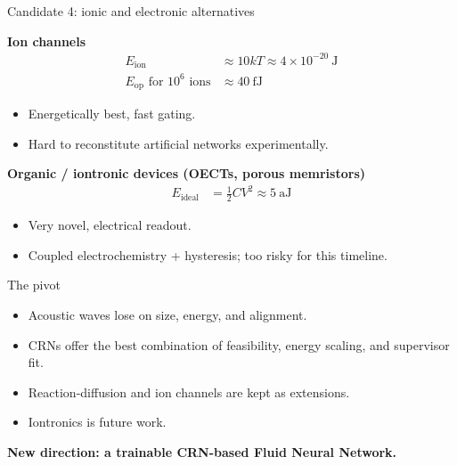 \documentclass[aspectratio=169,11pt]{beamer}
\begin{document}
\begin{frame}{Candidate 4: ionic and electronic alternatives}

\textbf{Ion channels}
\begin{align*}
    E_{\text{ion}} &\approx 10kT \approx 4\times10^{-20}\ \text{J} \\
    E_{\text{op}} \text{ for } 10^6 \text{ ions} &\approx 40\ \text{fJ}
\end{align*}
\begin{itemize}
    \item Energetically best, fast gating.
    \item Hard to reconstitute artificial networks experimentally.
\end{itemize}

\vspace{0.4cm}
\textbf{Organic / iontronic devices (OECTs, porous memristors)}
\begin{align*}
    E_{\text{ideal}} &= \tfrac{1}{2}CV^2 \approx 5\ \text{aJ}
\end{align*}
\begin{itemize}
    \item Very novel, electrical readout.
    \item Coupled electrochemistry + hysteresis; too risky for this timeline.
\end{itemize}

\end{frame}

\begin{frame}{The pivot}

\begin{itemize}
    \item Acoustic waves lose on size, energy, and alignment.
    \item CRNs offer the best combination of feasibility, energy scaling, and supervisor fit.
    \item Reaction-diffusion and ion channels are kept as extensions.
    \item Iontronics is future work.
\end{itemize}

\vspace{0.5cm}
\centering
\Large
\textbf{New direction: a trainable CRN-based Fluid Neural Network.}

\end{frame}
\end{document}
